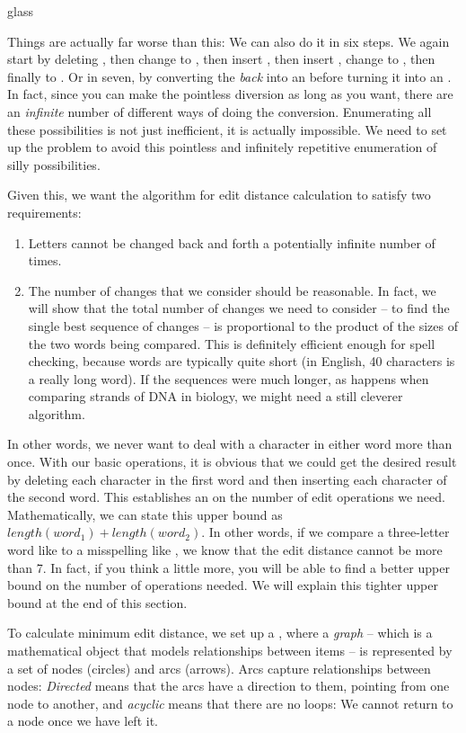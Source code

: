 \begin{tblsfilledsymbol}{}{glass}
\begin{underthehood}
Things are actually far worse than this: We can also do it in six
steps. We again start by
deleting , then change  to
, then insert , then insert , change
 to , then finally  to .  
Or in seven, by converting the  \emph{back} into an 
before turning it into an . In fact, since you can make the
pointless diversion as long as you want, there are an \emph{infinite}
number of different ways of doing the conversion. Enumerating all these
possibilities is not just inefficient, it is actually impossible.
We need to
set up the problem to avoid this pointless and infinitely repetitive
enumeration of silly possibilities.  

Given this, we want the algorithm for edit distance calculation to satisfy two
requirements:
\begin{enumerate}
\item Letters cannot be changed back and forth a potentially infinite
  number of times.
\item The number of changes that we consider should be reasonable. In
  fact, we will show that the total number of changes we need to consider -- to find the single best sequence of changes -- is
  proportional to the product of the sizes of the two words being
  compared. This is definitely efficient enough for spell checking,
  because words are typically quite short (in English, 40 characters is a really
  long word). If the sequences were much longer, as happens when
  comparing strands of DNA in biology, we might need a still cleverer
  algorithm.
\end{enumerate}

In other words, we never want to deal with a character in either word
more than once.  With our basic operations, it is obvious that we
could get the desired result by deleting each character in the first
word and then inserting each character of the second word.  This
establishes an  on the number of edit operations
we need. 
Mathematically, we can state this upper bound as $length(word_1) +
length(word_2)$.  In other words, if we compare a three-letter word
like  to a misspelling like , we know that
the edit distance cannot be more than 7.  In fact, if you think a
little more, you will be able to find a better upper bound on the
number of operations needed.  We will explain this tighter upper bound
at the end of this section.

To calculate minimum edit distance, we set up a , where a \emph{graph} -- which is a mathematical
object that models relationships between items -- is represented by a
set of nodes (circles) and arcs (arrows).  Arcs capture relationships
between nodes: \emph{Directed} means that the arcs have a direction to
them, pointing from one node to another, and \emph{acyclic} means that
there are no loops: We cannot return to a node once we have left it.


\end{underthehood}
\end{tblsfilledsymbol}
